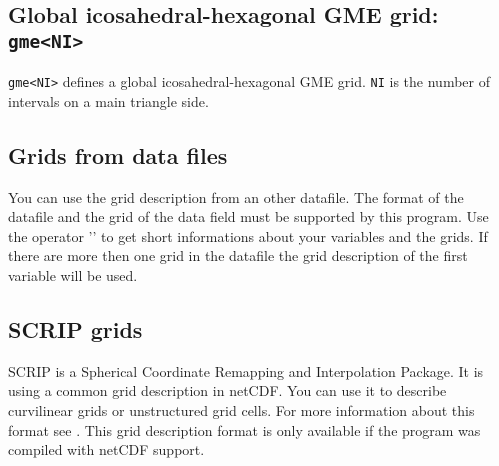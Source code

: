 
\subsection*{Global icosahedral-hexagonal GME grid: {\tt gme<NI>}}
    {\tt gme<NI>} defines a global icosahedral-hexagonal GME grid.
    {\tt NI} is the number of intervals on a main triangle side.

\subsection{Grids from data files}

You can use the grid description from an other datafile.
The format of the datafile and the grid of the data field must
be supported by this program.
Use the operator '' to get short informations about
your variables and the grids.
If there are more then one grid in the datafile the grid description of
the first variable will be used.

\subsection{SCRIP grids}

SCRIP is a Spherical Coordinate Remapping and Interpolation Package.
It is using a common grid description in netCDF.
You can use it to describe curvilinear grids or unstructured grid cells.
For more information about this format see \cite{SCRIP}.
This grid description format is only available if the program was compiled
with netCDF support.

\vspace{2mm}

